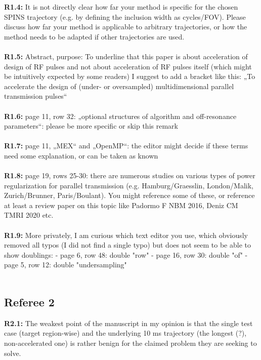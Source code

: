 \documentclass[11pt]{article}
\newcommand{\mysubsectionstar}[1]{\vspace{0mm}\subsection*{#1}\vspace{0mm}}
\begin{document}
{\bf R1.4:} It is not directly clear how far your method is specific for the chosen SPINS trajectory (e.g. by defining the inclusion width as cycles/FOV). Please discuss how far your method is applicable to arbitrary trajectories, or how the method needs to be adapted if other trajectories are used.
\\[0.2em]
\indent{\it \textcolor{blue}{Done.}}
\\[1.2em]

{\bf R1.5:} Abstract, purpose: To underline that this paper is about acceleration of design of RF pulses and not about acceleration of RF pulses itself (which might be intuitively expected by some readers) I suggest to add a bracket like this: „To accelerate the design of (under- or oversampled) multidimensional parallel transmission pulses“
\\[0.2em]
\indent{\it \textcolor{blue}{Done.}}
\\[1.2em]

{\bf R1.6:} page 11, row 32: „optional structures of algorithm and off-resonance parameters“: please be more specific or skip this remark
\\[0.2em]
\indent{\it \textcolor{blue}{Done.}}
\\[1.2em]

{\bf R1.7:} page 11, „MEX“ and „OpenMP“: the editor might decide if these terms need some explanation, or can be taken as known
\\[0.2em]
\indent{\it \textcolor{blue}{Done.}}
\\[1.2em]

{\bf R1.8:} page 19, rows 25-30: there are numerous studies on various types of power regularization for parallel transmission (e.g. Hamburg/Graesslin, London/Malik, Zurich/Brunner, Paris/Boulant). You might reference some of these, or reference at least a review paper on this topic like Padormo F NBM 2016, Deniz CM TMRI 2020 etc.
\\[0.2em]
\indent{\it \textcolor{blue}{Done.}}
\\[1.2em]

{\bf R1.9:} More privately, I am curious which text editor you use, which obviously removed all typos (I did not find a single typo) but does not seem to be able to show doublings:
- page 6, row 48: double "row"
- page 16, row 30: double "of"
- page 5, row 12: double "undersampling"
\\[0.2em]
\indent{\it \textcolor{blue}{Done.}}
\\[1.2em]

\mysubsectionstar{Referee 2}
{\bf R2.1:} The weakest point of the manuscript in my opinion is that the single test case (target region-wise) and the underlying 10 ms trajectory (the longest (?), non-accelerated one) is rather benign for the claimed problem they are seeking to solve.
\end{document}
